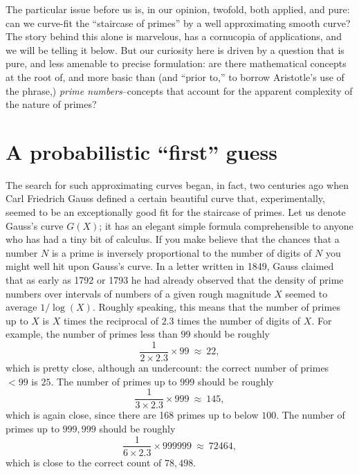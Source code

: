 \documentclass[11pt]{article}
\theoremstyle{plain}
\theoremstyle{definition}
\numberwithin{equation}{section}
\numberwithin{figure}{section}
\numberwithin{table}{section}
\begin{document}
The particular issue before us is, in our opinion, twofold, both
applied, and pure: can we curve-fit the ``staircase of primes'' by a
well approximating smooth curve?  The story behind this alone is
marvelous, has a cornucopia of applications, and we will be telling it
below. But our curiosity here is driven by a question that is pure,
and less amenable to precise formulation: are there mathematical
concepts at the root of, and more basic than (and ``prior to,'' to
borrow Aristotle's use of the phrase,) {\em prime numbers}--concepts
that account for the apparent complexity of the nature of primes?
   
   
   
\section{A probabilistic ``first'' guess }
The search for such approximating curves began, in fact, two centuries
ago when Carl Friedrich Gauss defined a certain beautiful curve that,
experimentally, seemed to be an exceptionally good fit for the
staircase of primes. Let us denote Gauss's curve $G(X)$; it has an
elegant simple formula comprehensible to anyone who has had a tiny bit
of calculus.  If you make believe that the chances that a number $N$ is
a prime is inversely proportional to the number of digits of $N$ you
might well hit upon Gauss's curve.   In a letter written in 1849, Gauss
claimed that as early as 1792 or 1793 he had already observed that the
density of prime numbers over intervals of numbers of a given rough
magnitude $X$ seemed to average $1/\log(X)$.  Roughly speaking, this
means that the number of primes up to $X$ is $X$ times the reciprocal 
of $2.3$ times the number of digits of $X$.  For example,
the number of primes less than $99$ should be roughly
$$
   {\frac{1}{2\times 2.3}}\times 99\ \approx \ 22,
$$   
which is pretty close, although an undercount: the correct number of
primes $< 99$ is $25$.  The number of primes up to $999$ should
be roughly
$$
   {\frac{1}{3\times 2.3}}\times 999\ \approx \ 145,
$$   
which is again close, since there are 168 primes up to below $100$. 
The number of primes up to $999,\!999$ should be roughly
$$
   {\frac{1}{6\times 2.3}}\times 999999\ \approx \ 72464,
$$   
which is close to the correct count of $78,\!498$.
\end{document}
